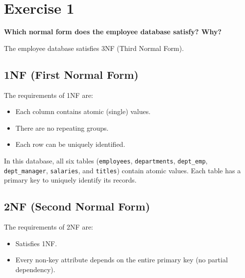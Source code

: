 \documentclass[a4paper,12pt]{report}
\begin{document}
\newpage

\newpage
\chapter{Exercise 1}

\setlength{\parindent}{0pt}
\setlength{\parskip}{6pt}


\noindent
\textbf{\large Which normal form does the employee database satisfy? Why?}

The employee database satisfies 3NF (Third Normal Form).


\section{1NF (First Normal Form)}

The requirements of 1NF are:

\begin{itemize}
    \setlength{\itemsep}{3pt}
    \item Each column contains atomic (single) values.
    \item There are no repeating groups.
    \item Each row can be uniquely identified.
\end{itemize}

In this database, all six tables (\texttt{employees},
\texttt{departments}, \texttt{dept\_emp},
\texttt{dept\_manager}, \texttt{salaries}, and
\texttt{titles}) contain atomic values. Each table has a
primary key to uniquely identify its records.


\section{2NF (Second Normal Form)}

The requirements of 2NF are:

\begin{itemize}
    \setlength{\itemsep}{3pt}
    \item Satisfies 1NF.
    \item Every non-key attribute depends on the entire
    primary key (no partial dependency).
\end{itemize}
\end{document}
